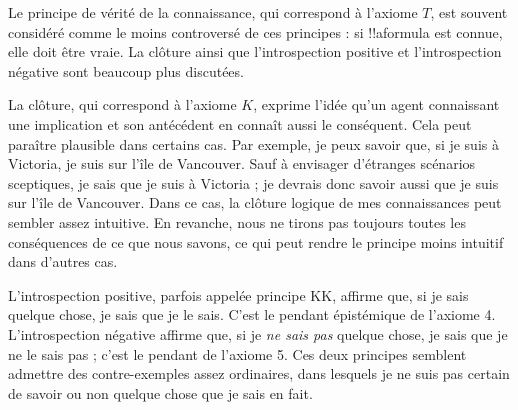 \documentclass[../../../include/open-logic-section]{subfiles}
\begin{document}
Le principe de vérité de la connaissance, qui correspond à l'axiome
$T$, est souvent considéré comme le moins controversé de ces
principes : si !!a{formula} est connue, elle doit être vraie. La clôture ainsi que
l'introspection positive et l'introspection négative sont beaucoup
plus discutées.

La clôture, qui correspond à l'axiome $K$, exprime l'idée qu'un agent
connaissant une implication et son antécédent en connaît aussi le
conséquent. Cela peut paraître plausible dans certains cas. Par
exemple, je peux savoir que, si je suis à Victoria, je suis sur
l'île de Vancouver. Sauf à envisager d'étranges scénarios sceptiques,
je sais que je suis à Victoria ; je devrais donc savoir aussi que
je suis sur l'île de Vancouver. Dans ce cas, la clôture logique de
mes connaissances peut sembler assez intuitive. En revanche, nous
ne tirons pas toujours toutes les conséquences de ce que nous savons,
ce qui peut rendre le principe moins intuitif dans d'autres cas.

L'introspection positive, parfois appelée principe KK, affirme que,
si je sais quelque chose, je sais que je le sais. C'est le pendant
épistémique de l'axiome 4. L'introspection négative affirme que,
si je \emph{ne sais pas} quelque chose, je sais que je ne le sais pas ;
c'est le pendant de l'axiome 5. Ces deux principes semblent admettre des contre-exemples assez
ordinaires, dans lesquels je ne suis pas certain de savoir ou non
quelque chose que je sais en fait.
%
%
\end{document}
